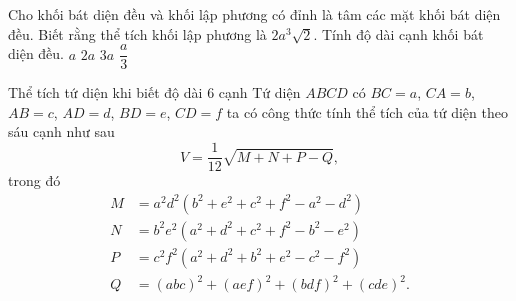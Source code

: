 \begin{vd}%
	Cho khối bát diện đều và khối lập phương có đỉnh là tâm các mặt khối bát diện đều. Biết rằng thể tích khối lập phương là $2a^3\sqrt{2}$. Tính độ dài cạnh khối bát diện đều.
	\choice
	{$a$}
	{$2a$}
	{\True $3a$}
	{$\dfrac{a}{3}$}
\end{vd}

\begin{dang}{Thể tích tứ diện khi biết độ dài $6$ cạnh}
	Tứ diện $ABCD$ có $BC=a$, $CA=b$, $AB=c$, $AD=d$, $BD=e$, $CD=f$ ta có công thức tính thể tích của tứ diện theo sáu cạnh như sau \[V=\frac{1}{12}\sqrt{M+N+P-Q},\] trong đó 
	\begin{align*}  M&={a^2}{d^2}({b^2}+{e^2}+{c^2}+{f^2}-{a^2}-{d^2}) \\  N&={b^2}{e^2}({a^2}+{d^2}+{c^2}+{f^2}-{b^2}-{e^2}) \\  P&={c^2}{f^2}({a^2}+{d^2}+{b^2}+{e^2}-{c^2}-{f^2}) \\  
	Q&={{(abc)}^2}+{{(aef)}^2}+{{(bdf)}^2}+{{(cde)}^2}.
	\end{align*}
\end{dang}